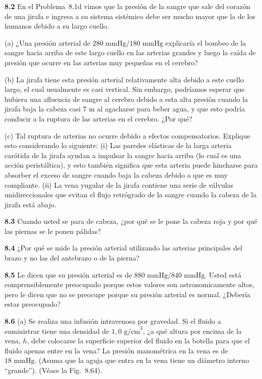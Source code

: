 \documentclass[12pt]{book}
\begin{document}
\textbf{8.2} En el Problema~8.1d vimos que la presión de la sangre que sale del corazón de una jirafa e ingresa a su sistema sistémico debe ser mucho mayor que la de los humanos debido a su largo cuello.

(a) ¿Una presión arterial de $280\text{ mmHg}/180\text{ mmHg}$ explicaría el bombeo de la sangre hacia arriba de este largo cuello en las arterias grandes y luego la caída de presión que ocurre en las arterias muy pequeñas en el cerebro?

(b) La jirafa tiene esta presión arterial relativamente alta debido a este cuello largo, el cual usualmente es casi vertical. Sin embargo, podríamos esperar que hubiera una afluencia de sangre al cerebro debido a esta alta presión cuando la jirafa baja la cabeza casi $7\text{ m}$ al agacharse para beber agua, y que esto podría conducir a la ruptura de las arterias en el cerebro. ¿Por qué?

(c) Tal ruptura de arterias no ocurre debido a efectos compensatorios. Explique esto considerando lo siguiente: (i) Las paredes elásticas de la larga arteria carótida de la jirafa ayudan a impulsar la sangre hacia arriba (lo cual es una acción peristáltica), y esto también significa que esta arteria puede hincharse para absorber el exceso de sangre cuando baja la cabeza debido a que es muy compliante. (ii) La vena yugular de la jirafa contiene una serie de válvulas unidireccionales que evitan el flujo retrógrado de la sangre cuando la cabeza de la jirafa está abajo.

\textbf{8.3} Cuando usted se para de cabeza, ¿por qué se le pone la cabeza roja y por qué las piernas se le ponen pálidas?

\textbf{8.4} ¿Por qué se mide la presión arterial utilizando las arterias principales del brazo y no las del antebrazo o de la pierna?

\textbf{8.5} Le dicen que su presión arterial es de $880\text{ mmHg}/840\text{ mmHg}$. Usted está comprensiblemente preocupado porque estos valores son astronomicamente altos, pero le dicen que no se preocupe porque su presión arterial es normal. ¿Debería estar preocupado?

\textbf{8.6} (a) Se realiza una infusión intravenosa por gravedad. Si el fluido a suministrar tiene una densidad de $1{,}0\text{ g/cm}^3$, ¿a qué altura por encima de la vena, $h$, debe colocarse la superficie superior del fluido en la botella para que el fluido apenas entre en la vena? La presión manométrica en la vena es de $18\text{ mmHg}$. (Asuma que la aguja que entra en la vena tiene un diámetro interno ``grande''). (Véase la Fig.~8.64).
\end{document}
